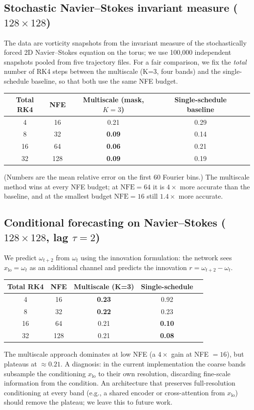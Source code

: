 \documentclass[11pt]{amsart}
\theoremstyle{remark}
\numberwithin{equation}{section}
\begin{document}
\subsection{Stochastic Navier--Stokes invariant measure ($128\times 128$)}
The data are vorticity snapshots from the invariant measure of the stochastically forced 2D Navier--Stokes equation on the torus; we use 100{,}000 independent snapshots pooled from five trajectory files. For a fair comparison, we fix the \emph{total} number of RK4 steps between the multiscale (K=3, four bands) and the single-schedule baseline, so that both use the same NFE budget.
\begin{center}
\begin{tabular}{ccccc}
\hline
Total RK4 & NFE & Multiscale (mask, $K=3$) & Single-schedule baseline \\
\hline
 4 &  16 & 0.21 & 0.29\\
 8 &  32 & \textbf{0.09} & 0.14\\
16 &  64 & \textbf{0.06} & 0.21\\
32 & 128 & \textbf{0.09} & 0.19\\
\hline
\end{tabular}
\end{center}
(Numbers are the mean relative error on the first 60 Fourier bins.) The multiscale method wins at every NFE budget; at $\mathrm{NFE}=64$ it is $4\times$ more accurate than the baseline, and at the smallest budget $\mathrm{NFE}=16$ still $1.4\times$ more accurate.

\subsection{Conditional forecasting on Navier--Stokes ($128\times 128$, lag $\tau=2$)}
We predict $\omega_{t+2}$ from $\omega_t$ using the innovation formulation: the network sees $x_{\mathrm{lo}}=\omega_t$ as an additional channel and predicts the innovation $r=\omega_{t+2}-\omega_t$.
\begin{center}
\begin{tabular}{ccccc}
\hline
Total RK4 & NFE & Multiscale (K=3) & Single-schedule\\
\hline
 4  &  16  & \textbf{0.23} & 0.92\\
 8  &  32  & \textbf{0.22} & 0.23\\
16  &  64  & 0.21           & \textbf{0.10}\\
32  & 128  & 0.21           & \textbf{0.08}\\
\hline
\end{tabular}
\end{center}
The multiscale approach dominates at low NFE (a $4\times$ gain at NFE $=16$), but plateaus at $\approx 0.21$. A diagnosis: in the current implementation the coarse bands subsample the conditioning $x_{\mathrm{lo}}$ to their own resolution, discarding fine-scale information from the condition. An architecture that preserves full-resolution conditioning at every band (e.g., a shared encoder or cross-attention from $x_{\mathrm{lo}}$) should remove the plateau; we leave this to future work.
\end{document}
